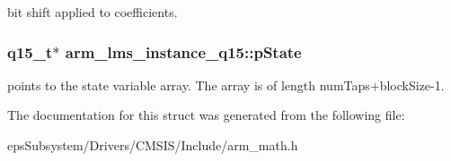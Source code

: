 bit shift applied to coefficients. \hypertarget{structarm__lms__instance__q15_a9a575ff82c1e68cbb583083439260d08}{
\subsubsection[{p\-State}]{\setlength{\rightskip}{0pt plus 5cm}q15\-\_\-t$\ast$ arm\-\_\-lms\-\_\-instance\-\_\-q15\-::p\-State}}\label{structarm__lms__instance__q15_a9a575ff82c1e68cbb583083439260d08}
points to the state variable array. The array is of length num\-Taps+block\-Size-\/1. 

The documentation for this struct was generated from the following file\-:\begin{DoxyCompactItemize}
\item 
eps\-Subsystem/\-Drivers/\-C\-M\-S\-I\-S/\-Include/arm\-\_\-math.\-h\end{DoxyCompactItemize}
